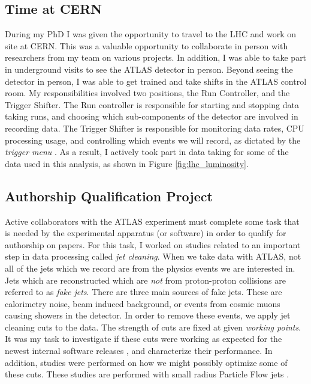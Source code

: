 \documentclass[12pt]{article}
\begin{document}
\subsection{Time at CERN}
During my PhD I was given the opportunity to travel to the LHC and work on site
at CERN. This was a valuable opportunity to collaborate in person with
researchers from my team on various projects. In addition, I was able to take
part in underground visits to see the ATLAS detector in person. Beyond seeing
the detector in person, I was able to get trained and take shifts in the ATLAS
control room. My responsibilities involved two positions, the Run Controller,
and the Trigger Shifter. The Run controller is responsible for starting and
stopping data taking runs, and choosing which sub-components of the detector are
involved in recording data. The Trigger Shifter is responsible for monitoring
data rates, CPU processing usage, and controlling which events we will record,
as dictated by the \textit{trigger menu} \cite{trigger_2017, HLT_2016}. As a
result, I actively took part in data taking for some of the data used in this
analysis, as shown in Figure \ref{fig:lhc_luminosity}.



\subsection{Authorship Qualification Project}
Active collaborators with the ATLAS experiment must complete some task that is
needed by the experimental apparatus (or software) in order to qualify for
authorship on papers. For this task, I worked on studies related to an important
step in data processing called \textit{jet cleaning}. When we take data with
ATLAS, not all of the jets which we record are from the physics events we are
interested in. Jets which are reconstructed which are \textit{not} from
proton-proton collisions are referred to as \textit{fake jets}. There are three
main sources of fake jets. These are calorimetry noise, beam induced background,
or events from cosmic muons causing showers in the detector. In order to remove
these events, we apply jet cleaning cuts to the data. The strength of cuts are
fixed at given \textit{working points}. It was my task to investigate if these
cuts were working as expected for the newest internal software releases
\cite{atlas_simulation}, and characterize their performance. In addition,
studies were performed on how we might possibly optimize some of these cuts.
These studies are performed with small radius Particle Flow jets
\cite{pflow_jets}.
\end{document}
